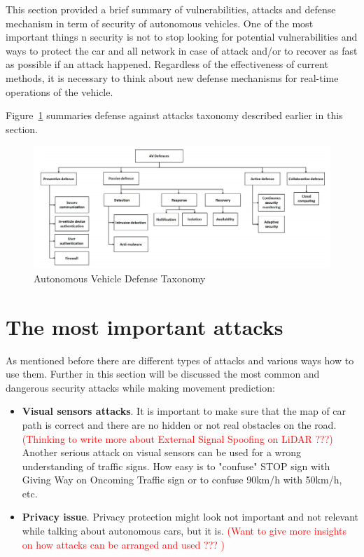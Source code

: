 This section provided a brief summary of vulnerabilities, attacks and defense mechanism in term of security of autonomous vehicles. One of the most important things n security is not to stop looking for potential vulnerabilities and ways to protect the car and all network in case of attack and/or to recover as fast as possible if an attack happened. Regardless of the effectiveness of current methods, it is necessary to think about new defense mechanisms for real-time operations of the vehicle. 	

Figure~\ref{fig:DefenseTaxonomy} summaries defense against attacks taxonomy described earlier in this section.

\begin{figure}[h]
	\centering  	
	\includegraphics[width=15cm]{img/7.jpg}
	\caption{Autonomous Vehicle Defense Taxonomy \cite{sec}}
	\label{fig:DefenseTaxonomy}    
\end{figure}

\section{The most important attacks}

As mentioned before there are different types of attacks and various ways how to use them. Further in this section will be discussed the most common and dangerous security attacks while making movement prediction:
\begin{itemize}
	\item \textbf{Visual sensors attacks}. It is important to make sure that the map of car path is correct and there are no hidden or not real obstacles on the road. \textcolor{red}{(Thinking to write more about External Signal Spoofing on \gls{LiDAR} ???)}
	Another serious attack on visual sensors can be used for a wrong understanding of traffic signs. How easy is to "confuse" STOP sign with Giving Way on Oncoming Traffic sign or to confuse 90km/h with 50km/h, etc.
	\item \textbf{Privacy issue}. Privacy protection might look not important and not relevant while talking about autonomous cars, but it is. \textcolor{red}{(Want to give more insights on how attacks can be arranged and used ??? )}
\end{itemize}

